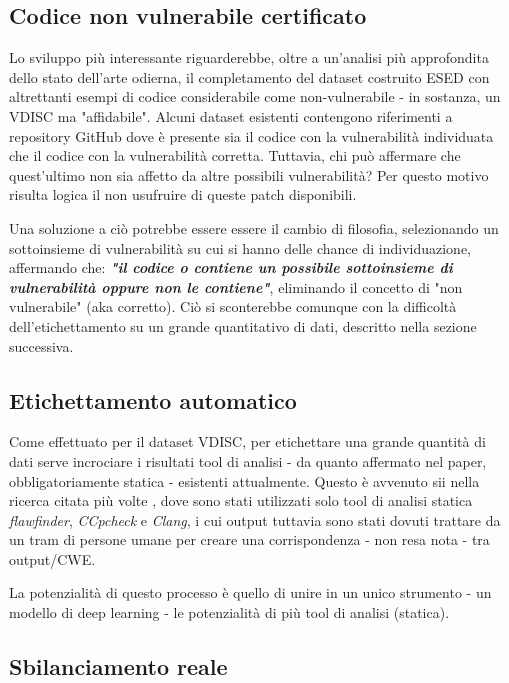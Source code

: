 \documentclass[conference]{IEEEtran}
\begin{document}
\subsection{Codice non vulnerabile certificato}
Lo sviluppo più interessante riguarderebbe, oltre a un'analisi più approfondita dello stato dell'arte odierna, il completamento del dataset costruito ESED con altrettanti esempi di codice considerabile come non-vulnerabile - in sostanza, un VDISC ma "affidabile". Alcuni dataset esistenti contengono riferimenti a repository GitHub dove è presente sia il codice con la vulnerabilità individuata che il codice con la vulnerabilità corretta. Tuttavia, chi può affermare che quest'ultimo non sia affetto da altre possibili vulnerabilità? Per questo motivo risulta logica il non usufruire di queste patch disponibili.

Una soluzione a ciò potrebbe essere essere il cambio di filosofia, selezionando un sottoinsieme di vulnerabilità su cui si hanno delle chance di individuazione, affermando che: \textbf{\textit{"il codice o contiene un possibile sottoinsieme di vulnerabilità oppure non le contiene"}}, eliminando il concetto di "non vulnerabile" (aka corretto). Ciò si sconterebbe comunque con la difficoltà dell'etichettamento su un grande quantitativo di dati, descritto nella sezione successiva.

\subsection{Etichettamento automatico}
Come effettuato per il dataset VDISC, per etichettare una grande quantità di dati serve incrociare i risultati tool di analisi - da quanto affermato nel paper, obbligatoriamente statica - esistenti attualmente. Questo è avvenuto sii nella ricerca citata più volte \cite{russell2018automatedvulnerabilitydetectionsource}, dove sono stati utilizzati solo tool di analisi statica \textit{flawfinder}, \textit{CCpcheck} e \textit{Clang}, i cui output tuttavia sono stati dovuti trattare da un tram di persone umane per creare una corrispondenza - non resa nota - tra output/CWE.

La potenzialità di questo processo è quello di unire in un unico strumento - un modello di deep learning - le potenzialità di più tool di analisi (statica).

\subsection{Sbilanciamento reale}
\end{document}
